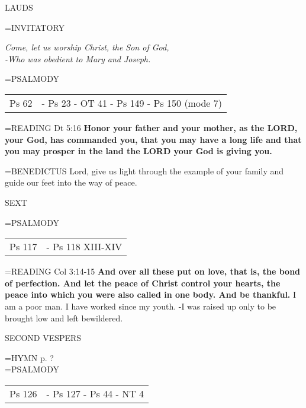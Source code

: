 \begin{flushleft}\normalsize LAUDS\\\end{flushleft}
\hangindent=\parindent \small{INVITATORY}
\begin{center}
\textit{Come, let us worship Christ, the Son of God,\\}
\textit{-Who was obedient to Mary and Joseph.\\}
\end{center}

\hangindent=\parindent \small{PSALMODY}
\begin{center}
\begin{tabular}{ l l }
Ps 62 &  - Ps 23 - OT 41 - Ps 149 - Ps 150 (mode 7)\\
\end{tabular}
\end{center}		

\hangindent=\parindent \small{READING}    Dt 5:16 \textbf{   Honor your father and your mother, as the LORD, your God, has commanded you, that you may have a long life and that you may prosper in the land the LORD your God is giving you. \\}

\hangindent=\parindent \small{BENEDICTUS 	Lord, give us light through the example of your family and guide our feet into the way of peace.\\}

\begin{flushleft}\normalsize SEXT\\\end{flushleft}
\hangindent=\parindent \small{PSALMODY}
\begin{center}
\begin{tabular}{ l l }
Ps 117 &  - Ps 118 XIII-XIV\\
\end{tabular}
\end{center}		

\hangindent=\parindent \small{READING}    Col 3:14-15 \textbf{   And over all these put on love, that is, the bond of perfection. And let the peace of Christ control your hearts, the peace into which you were also called in one body. And be thankful.}
I am a poor man. I have worked since my youth.
-I was raised up only to be brought low and left bewildered.

\begin{flushleft}\normalsize SECOND VESPERS\\\end{flushleft}
\hangindent=\parindent \small{\uppercase{HYMN} p.  ?\\}
\hangindent=\parindent \small{PSALMODY}
\begin{center}
\begin{tabular}{ l l }
Ps 126 &  - Ps 127 - Ps 44 - NT 4\\
\end{tabular}
\end{center}		

